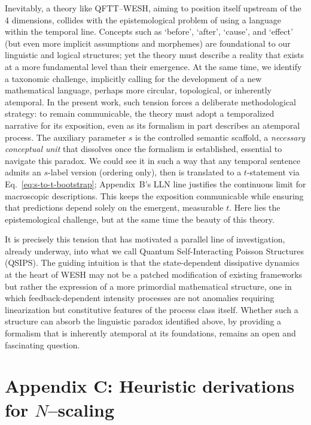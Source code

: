 \documentclass[12pt,a4paper]{article}
\numberwithin{equation}{section}
\begin{document}
\vspace{0.5cm}
Inevitably, a theory like QFTT--WESH, aiming to position itself upstream of the 4 dimensions, collides with the epistemological problem of using a language within the temporal line. Concepts such as `before', `after', `cause', and `effect' (but even more implicit assumptions and morphemes) are foundational to our linguistic and logical structures; yet the theory must describe a reality that exists at a more fundamental level than their emergence. At the same time, we identify a taxonomic challenge, implicitly calling for the development of a new mathematical language, perhaps more circular, topological, or inherently atemporal. In the present work, such tension forces a deliberate methodological strategy: to remain communicable, the theory must adopt a temporalized narrative for its exposition, even as its formalism in part describes an atemporal process. The auxiliary parameter $s$ is the controlled semantic scaffold, a \emph{necessary conceptual unit} that dissolves once the formalism is established, essential to navigate this paradox. We could see it in such a way that any temporal sentence admits an $s$-label version (ordering only), then is translated to a $t$-statement via Eq.~\eqref{eq:s-to-t-bootstrap}; Appendix~B's LLN line justifies the continuous limit for macroscopic descriptions. This keeps the exposition communicable while ensuring that predictions depend solely on the emergent, measurable $t$. Here lies the epistemological challenge, but at the same time the beauty of this theory.

\vspace{0.3cm}
\noindent It is precisely this tension that has motivated a parallel line of investigation, already underway, into what we call Quantum Self-Interacting Poisson Structures (QSIPS). The guiding intuition is that the state-dependent dissipative dynamics at the heart of WESH may not be a patched modification of existing frameworks but rather the expression of a more primordial mathematical structure, one in which feedback-dependent intensity processes are not anomalies requiring linearization but constitutive features of the process class itself. Whether such a structure can absorb the linguistic paradox identified above, by providing a formalism that is inherently atemporal at its foundations, remains an open and fascinating question.
\endgroup

\vspace{1cm}

\section*{Appendix C: Heuristic derivations for $N$–scaling}
\label{app:heuristics}
\end{document}
